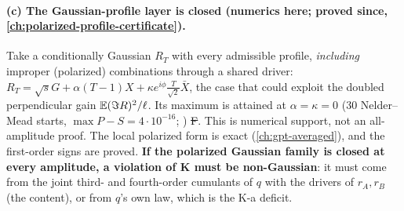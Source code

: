 \paragraph{(c) The Gaussian-profile layer is closed (numerics here; proved since, \autoref{ch:polarized-profile-certificate}).} Take a conditionally Gaussian $R_T$ with every admissible profile, \emph{including} improper (polarized) combinations through a shared
driver: $R_T=\sqrt sG+\alpha(T-1)X+\kappa e^{i\phi}\tfrac T{\sqrt2}\bar X$, the case that could exploit the doubled perpendicular gain $\mathbb E(\Im R)^2/\ell$. Its maximum is attained at
$\alpha=\kappa=0$ (30 Nelder--Mead starts, $\max P-S=4\cdot10^{-16}$; ) \st{F}. This is numerical support, not an all-amplitude proof. The local polarized form is exact
(\autoref{ch:gpt-averaged}), and the first-order signs are proved. \textbf{If the polarized Gaussian family is closed at every amplitude, a violation of K must be non-Gaussian}: it must come from the joint third- and fourth-order cumulants of $q$ with the drivers of $r_A,r_B$ (the content), or from $q$'s own law,
which is the K-a deficit.

